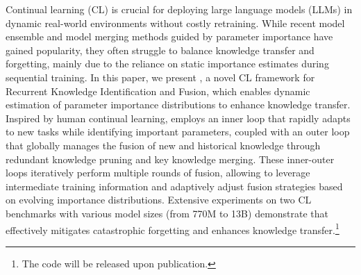 Continual learning (CL) is crucial for deploying large language models (LLMs) in dynamic real-world environments without costly retraining. 
While recent model ensemble and model merging methods guided by parameter importance have gained popularity, they often struggle to balance knowledge transfer and forgetting, mainly due to the reliance on static importance estimates during sequential training.
In this paper, we present {\ouralg}, a novel CL framework for Recurrent Knowledge Identification and Fusion, which enables dynamic estimation of parameter importance distributions to enhance knowledge transfer.
Inspired by human continual learning, {\ouralg} employs an inner loop that rapidly adapts to new tasks while identifying important parameters, coupled with an outer loop that globally manages the fusion of new and historical knowledge through redundant knowledge pruning and key knowledge merging.
These inner-outer loops iteratively perform multiple rounds of fusion, allowing {\ouralg} to leverage intermediate training information and adaptively adjust fusion strategies based on evolving importance distributions. 
Extensive experiments on two CL benchmarks with various model sizes (from 770M to 13B) demonstrate that {\ouralg} effectively mitigates catastrophic forgetting and enhances knowledge transfer.\footnote{The code will be released upon publication.}





